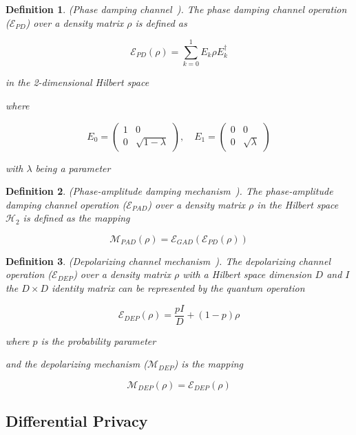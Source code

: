\documentclass{ieeeaccess}
\newtheorem{definition}{Definition}[section]
\begin{document}
\begin{definition}
  (Phase damping channel~\cite{zhou2017differential}). The phase damping channel operation ($\mathcal{E}_{PD}$) over a density matrix $\rho$ is defined as

  \[
    \mathcal{E}_{PD}(\rho) = \sum_{k = 0}^{1}E_{k}\rho E_{k}^{\dagger}
  \]

  in the 2-dimensional Hilbert space

  where

  \[
    E_0 =
    \begin{pmatrix} 1 & 0 \\ 0 & \sqrt{1-\lambda}
    \end{pmatrix}, \quad
    E_1 =
    \begin{pmatrix} 0 & 0 \\ 0 & \sqrt{\lambda}
    \end{pmatrix}
  \]

  with $\lambda$ being a parameter
  \label{def:phase_damping}
\end{definition}

\begin{definition}
  (Phase-amplitude damping mechanism~\cite{zhou2017differential}). The phase-amplitude damping channel operation ($\mathcal{E}_{PAD}$) over a density matrix $\rho$ in the Hilbert space $\mathcal{H}_2$ is defined as the mapping

  \[
    \mathcal{M}_{PAD}(\rho) = \mathcal{E}_{GAD}(\mathcal{E}_{PD}(\rho))
  \]
  \label{def:pad}
\end{definition}

\begin{definition}
  (Depolarizing channel mechanism~\cite{zhou2017differential}). The depolarizing channel operation ($\mathcal{E}_{DEP}$) over a density matrix $\rho$ with a Hilbert space dimension $D$ and $I$ the $D \times D$ identity matrix can be represented by the quantum operation

  \[
    \mathcal{E}_{DEP}(\rho) = \frac{pI}{D} + (1-p)\rho
  \]

  where $p$ is the probability parameter

  and the depolarizing mechanism ($\mathcal{M}_{DEP}$) is the mapping

  \[
    \mathcal{M}_{DEP}(\rho) = \mathcal{E}_{DEP}(\rho)
  \]
  \label{def:dep}
\end{definition}


\subsection{Differential Privacy}
\end{document}
